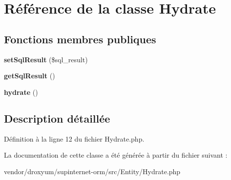 \hypertarget{class_o_r_m_1_1_entity_1_1_hydrate}{}\section{Référence de la classe Hydrate}
\label{class_o_r_m_1_1_entity_1_1_hydrate}
\subsection*{Fonctions membres publiques}
\begin{DoxyCompactItemize}
\item 
{\bfseries set\+Sql\+Result} (\$sql\+\_\+result)\hypertarget{class_o_r_m_1_1_entity_1_1_hydrate_a171c413a212b68ec2d00ebf6b21cc308}{}\label{class_o_r_m_1_1_entity_1_1_hydrate_a171c413a212b68ec2d00ebf6b21cc308}

\item 
{\bfseries get\+Sql\+Result} ()\hypertarget{class_o_r_m_1_1_entity_1_1_hydrate_a3ad0f4604e0776b234cd5238915c29a6}{}\label{class_o_r_m_1_1_entity_1_1_hydrate_a3ad0f4604e0776b234cd5238915c29a6}

\item 
{\bfseries hydrate} ()\hypertarget{class_o_r_m_1_1_entity_1_1_hydrate_ae484b7fa643da515c655c01ee0ef7645}{}\label{class_o_r_m_1_1_entity_1_1_hydrate_ae484b7fa643da515c655c01ee0ef7645}

\end{DoxyCompactItemize}


\subsection{Description détaillée}


Définition à la ligne 12 du fichier Hydrate.\+php.



La documentation de cette classe a été générée à partir du fichier suivant \+:\begin{DoxyCompactItemize}
\item 
vendor/droxyum/supinternet-\/orm/src/\+Entity/Hydrate.\+php\end{DoxyCompactItemize}
